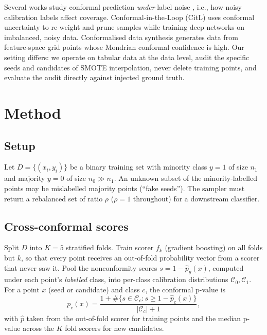 \documentclass[10pt]{article} %
\begin{document}
Several works study conformal prediction \emph{under} label noise \citep{einbinder2024label, penso2024conformal}, i.e., how noisy calibration labels affect coverage. Conformal-in-the-Loop (CitL) \citep{grahamknight2024conformal} uses conformal uncertainty to re-weight and prune samples while training deep networks on imbalanced, noisy data. Conformalised data synthesis \citep{meister2024conformalised} generates data from feature-space grid points whose Mondrian conformal confidence is high. Our setting differs: we operate on tabular data at the data level, audit the specific seeds and candidates of SMOTE interpolation, never delete training points, and evaluate the audit directly against injected ground truth.

\section{Method}

\subsection{Setup}

Let $D = \{(x_i, y_i)\}$ be a binary training set with minority class $y=1$ of size $n_1$ and majority $y=0$ of size $n_0 \gg n_1$. An unknown subset of the minority-labelled points may be mislabelled majority points (``fake seeds''). The sampler must return a rebalanced set of ratio $\rho$ ($\rho = 1$ throughout) for a downstream classifier.

\subsection{Cross-conformal scores}

Split $D$ into $K=5$ stratified folds. Train scorer $f_k$ (gradient boosting) on all folds but $k$, so that every point receives an out-of-fold probability vector from a scorer that never saw it. Pool the nonconformity scores $s = 1 - \hat{p}_{y}(x)$, computed under each point's \emph{labelled} class, into per-class calibration distributions $\mathcal{C}_0, \mathcal{C}_1$. For a point $x$ (seed or candidate) and class $c$, the conformal p-value is
\begin{equation}
p_c(x) = \frac{1 + \#\{s \in \mathcal{C}_c : s \ge 1 - \hat{p}_c(x)\}}{|\mathcal{C}_c| + 1},
\end{equation}
with $\hat{p}$ taken from the out-of-fold scorer for training points and the median p-value across the $K$ fold scorers for new candidates.
\end{document}
